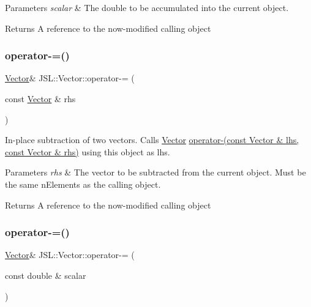 \begin{DoxyParams}{Parameters}
{\em scalar} & The double to be accumulated into the current object. \\
\hline
\end{DoxyParams}
\begin{DoxyReturn}{Returns}
A reference to the now-\/modified calling object 
\end{DoxyReturn}
\mbox{\label{classJSL_1_1Vector_a71720a9266944049cd3adfbe50e1703f}} 
\subsubsection{\texorpdfstring{operator-\/=()}{operator-=()}\hspace{0.1cm}{\footnotesize\ttfamily [1/2]}}
{\footnotesize\ttfamily \hyperlink{classJSL_1_1Vector}{Vector}\& J\+S\+L\+::\+Vector\+::operator-\/= (\begin{DoxyParamCaption}\item[{const \hyperlink{classJSL_1_1Vector}{Vector} \&}]{rhs }\end{DoxyParamCaption})\hspace{0.3cm}{\ttfamily [inline]}}



In-\/place subtraction of two vectors. Calls \hyperlink{classJSL_1_1Vector}{Vector} \hyperlink{namespaceJSL_a1d8393f2865dc23e7975ad041e341ba5}{operator-\/(const Vector \& lhs, const Vector \& rhs)} using this object as lhs. 


\begin{DoxyParams}{Parameters}
{\em rhs} & The vector to be subtracted from the current object. Must be the same n\+Elements as the calling object. \\
\hline
\end{DoxyParams}
\begin{DoxyReturn}{Returns}
A reference to the now-\/modified calling object 
\end{DoxyReturn}
\mbox{\label{classJSL_1_1Vector_a8a395851b8dffbe5b0aea7e051f9aac8}} 
\subsubsection{\texorpdfstring{operator-\/=()}{operator-=()}\hspace{0.1cm}{\footnotesize\ttfamily [2/2]}}
{\footnotesize\ttfamily \hyperlink{classJSL_1_1Vector}{Vector}\& J\+S\+L\+::\+Vector\+::operator-\/= (\begin{DoxyParamCaption}\item[{const double \&}]{scalar }\end{DoxyParamCaption})\hspace{0.3cm}{\ttfamily [inline]}}




